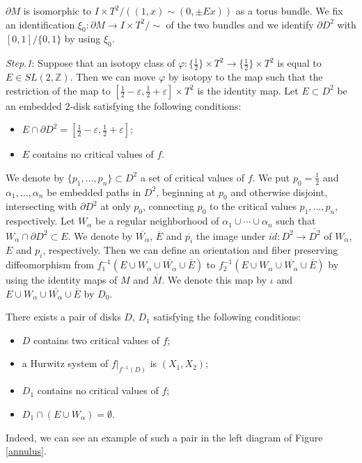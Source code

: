 \documentclass{amsart}
\theoremstyle{plain}
\theoremstyle{definition}
\begin{document}
\par

$\partial M$ is isomorphic to $I\times T^2/((1,x)\sim(0,\pm Ex))$ as a torus bundle. 
We fix an identification $\xi_0:\partial M\rightarrow I\times T^2/\sim$ of the two bundles and we identify $\partial D^2$ with $[0,1]/\{0,1\}$ by using $\xi_0$. 

\par

{\it Step.1}: Suppose that an isotopy class of $\varphi:\{\frac{1}{2}\}\times T^2\rightarrow\{\frac{1}{2}\}\times T^2$ is equal to $E\in SL(2,\mathbb{Z})$. 
Then we can move $\varphi$ by isotopy to the map such that the restriction of the map to $[\frac{1}{2}-\varepsilon,\frac{1}{2}+\varepsilon]\times T^2$ is the identity map. 
Let $E\subset D^2$ be an embedded $2$-disk satisfying the following conditions: 

\begin{itemize}

\item $E\cap\partial D^2=[\frac{1}{2}-\varepsilon,\frac{1}{2}+\varepsilon]$; 

\item $E$ contains no critical values of $f$. 

\end{itemize}
\noindent
We denote by $\{p_1,\ldots,p_n\}\subset D^2$ a set of critical values of $f$. 
We put $p_0=\frac{1}{2}$ and $\alpha_1,\ldots,\alpha_n$ be embedded paths in $D^2$, beginning at $p_0$ and otherwise disjoint, intersecting with $\partial D^2$ at only $p_0$, 
connecting $p_0$ to the critical values $p_1,\ldots,p_n$, respectively. 
Let $W_\alpha$ be a regular neighborhood of $\alpha_1\cup\cdots\cup\alpha_n$ such that $W_\alpha\cap\partial D^2\subset E$. 
We denote by $\overline{W_\alpha}$, $\overline{E}$ and $\overline{p_i}$ the image under $id:D^2\rightarrow\overline{D^2}$ of $W_\alpha$, $E$ and $p_i$, respectively. 
Then we can define an orientation and fiber preserving diffeomorphism from $f_1^{-1}(E\cup W_\alpha\cup\overline{W_\alpha}\cup\overline{E})$ to $f_2^{-1}(E\cup W_\alpha\cup\overline{W_\alpha}\cup\overline{E})$
by using the identity maps of $M$ and $\overline{M}$. We denote this map by $\iota$ and $E\cup W_\alpha\cup\overline{W_\alpha}\cup\overline{E}$ by $D_0$. 

\par

There exists a pair of disks $D$, $D_1$ satisfying the following conditions: 

\begin{itemize}

\item $D$ contains two critical values of $f$; 

\item a Hurwitz system of $f|_{f^{-1}(D)}$ is $(X_1,X_2)$; 

\item $D_1$ contains no critical values of $f$; 

\item $D_1\cap(E\cup W_\alpha)=\emptyset$. 

\end{itemize}
Indeed, we can see an example of such a pair in the left diagram of Figure \ref{annulus}. 
\end{document}
